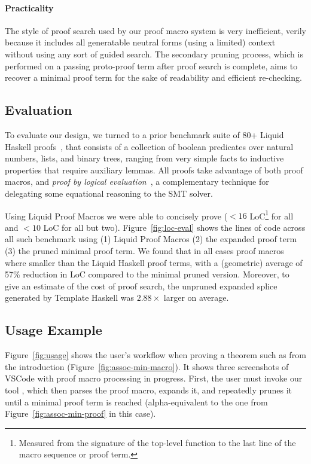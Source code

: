 \paragraph{Practicality}
%
The style of proof search used by our proof macro system is very
inefficient, verily because it includes all generatable neutral forms
(using a limited) context without using any sort of guided search. The
secondary pruning process, which is performed on a passing proto-proof
term after proof search is complete, aims to recover a minimal proof
term for the sake of readability and efficient re-checking.

\subsection{Evaluation}
\label{sec:eval-eval}

To evaluate our design, we turned to a prior benchmark suite of 80+
Liquid Haskell proofs~\cite{TacticThesis}, that consists of a
collection of boolean predicates over natural numbers, lists, and
binary trees, ranging from very simple facts to inductive properties
that require auxiliary lemmas. All proofs take advantage of both proof
macros, and {\em proof by logical evaluation}~\cite{VazouTCSNWJ18}, a
complementary technique for delegating some equational reasoning to
the SMT solver.

Using Liquid Proof Macros we were able to concisely prove ($<16$
LoC\footnote{Measured from the signature of the top-level function to the last
line of the macro sequence or proof term.} for all and $<10$ LoC for all but
two). Figure~\ref{fig:loc-eval} shows the lines of code across all such
benchmark using (1) Liquid Proof Macros (2) the expanded proof term (3) the
pruned minimal proof term. We found that in all cases proof macros where smaller
than the Liquid Haskell proof terms, with a (geometric) average of 57\%
reduction in LoC compared to the minimal pruned version. Moreover, to give an
estimate of the cost of proof search, the unpruned expanded splice generated by
Template Haskell was $2.88\times$ larger on average.

\subsection{Usage Example}
\label{sec:example}

Figure~\ref{fig:usage} shows the user's workflow when proving a
theorem such as  from the introduction
(Figure~\ref{fig:assoc-min-macro}). It shows three screenshots of
VSCode with proof macro processing in progress. First, the user must
invoke our tool , which then parses the proof macro,
expands it, and repeatedly prunes it until a minimal proof term is
reached (alpha-equivalent to the one from
Figure~\ref{fig:assoc-min-proof} in this case).


